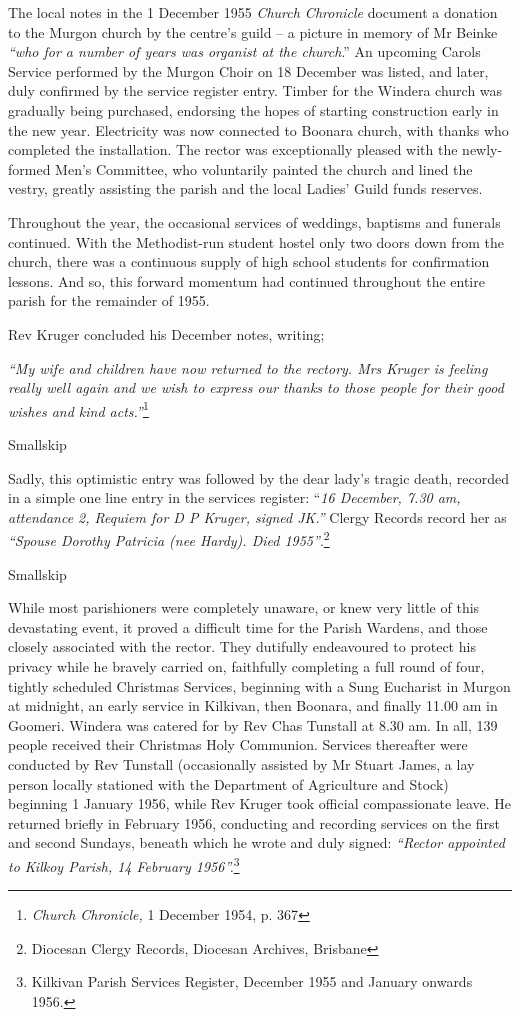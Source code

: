 The local notes in the 1 December 1955 \emph{Church Chronicle} document a donation to the Murgon church by the centre's guild -- a picture in memory of Mr Beinke \emph{``who for a number of years was organist at the church}.'' An upcoming Carols Service performed by the Murgon Choir on 18 December was listed, and later, duly confirmed by the service register entry. Timber for the Windera church was gradually being purchased, endorsing the hopes of starting construction early in the new year. Electricity was now connected to Boonara church, with thanks who completed the installation. The rector was exceptionally pleased with the newly-formed Men's Committee, who voluntarily painted the church and lined the vestry, greatly assisting the parish and the local Ladies' Guild funds reserves.

Throughout the year, the occasional services of weddings, baptisms and funerals continued. With the Methodist-run student hostel only two doors down from the church, there was a continuous supply of high school students for confirmation lessons. And so, this forward momentum had continued throughout the entire parish for the remainder of 1955.

Rev Kruger concluded his December notes, writing;

\emph{``My wife and children have now returned to the rectory. Mrs Kruger is feeling really well again and we wish to express our thanks to those people for their good wishes and kind acts.''}\footnote{\emph{Church Chronicle,} 1 December 1954, p. 367}

Smallskip

Sadly, this optimistic entry was followed by the dear lady's tragic death, recorded in a simple one line entry in the services register: ``\emph{16 December, 7.30 am, attendance 2, Requiem for D P Kruger, signed JK.''} Clergy Records record her as \emph{``Spouse Dorothy Patricia (nee Hardy). Died 1955''}.\footnote{Diocesan Clergy Records, Diocesan Archives, Brisbane}

Smallskip

While most parishioners were completely unaware, or knew very little of this devastating event, it proved a difficult time for the Parish Wardens, and those closely associated with the rector. They dutifully endeavoured to protect his privacy while he bravely carried on, faithfully completing a full round of four, tightly scheduled Christmas Services, beginning with a Sung Eucharist in Murgon at midnight, an early service in Kilkivan, then Boonara, and finally 11.00 am in Goomeri. Windera was catered for by Rev Chas Tunstall at 8.30 am. In all, 139 people received their Christmas Holy Communion. Services thereafter were conducted by Rev Tunstall (occasionally assisted by Mr Stuart James, a lay person locally stationed with the Department of Agriculture and Stock) beginning 1 January 1956, while Rev Kruger took official compassionate leave. He returned briefly in February 1956, conducting and recording services on the first and second Sundays, beneath which he wrote and duly signed: \emph{``Rector appointed to Kilkoy Parish, 14 February 1956''.}\footnote{Kilkivan Parish Services Register, December 1955 and January onwards 1956.}

